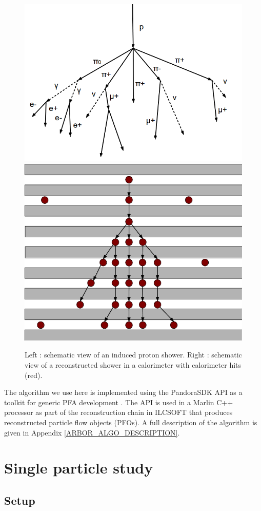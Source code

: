 \documentclass[12pt]{article}
\begin{document}
\begin{figure}[!ht]
  \begin{center}
    \includegraphics[width=0.45\linewidth]{ProtonDecay.png} \hfill
    \includegraphics[width=0.45\linewidth]{ArborSchema.png}
  \end{center}
  \caption{\label{ARBOR_STRUCTURE} Left : schematic view of an induced proton shower. Right : schematic view of a reconstructed shower in a calorimeter with calorimeter hits (red).}
\end{figure}

The algorithm we use here is implemented using the PandoraSDK API as a toolkit for generic PFA development \cite{pandora-sdk}. The API is used in a Marlin \cite{marlin-lccd} C++ processor as part of the reconstruction chain in ILCSOFT \cite{ilcsoft} that produces reconstructed particle flow objects (PFOs). A full description of the algorithm is given in Appendix \ref{ARBOR_ALGO_DESCRIPTION}. 

\newpage
\section{Single particle study}
\label{SINGLE_PARTICLE_STUDY_SECTION}

\subsection{Setup}
\end{document}
